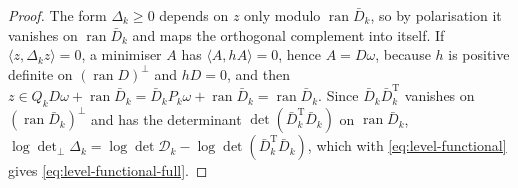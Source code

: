 \documentclass[11pt]{preprint}
\numberwithin{equation}{section}
\theoremstyle{definition}
\theoremstyle{remark}
\theoremstyle{plain}
\begin{document}
\begin{proof}
The form $\Delta_k \geq 0$ depends on $z$ only modulo $\operatorname{ran}\bar D_k$, so by polarisation it vanishes on $\operatorname{ran}\bar D_k$ and maps the orthogonal complement into itself. If $\langle z, \Delta_kz \rangle = 0$, a minimiser $A$ has $\langle A, hA \rangle = 0$, hence $A = D\omega$, because $h$ is positive definite on $(\operatorname{ran}D)^\perp$ and $hD = 0$, and then $z \in Q_kD\omega + \operatorname{ran}\bar D_k = \bar D_kP_k\omega + \operatorname{ran}\bar D_k = \operatorname{ran}\bar D_k$. Since $\bar D_k\bar D_k^{\mathrm T}$ vanishes on $(\operatorname{ran}\bar D_k)^\perp$ and has the determinant $\det(\bar D_k^{\mathrm T}\bar D_k)$ on $\operatorname{ran}\bar D_k$, $\log\det_\perp\Delta_k = \log\det\mathcal D_k - \log\det(\bar D_k^{\mathrm T}\bar D_k)$, which with \eqref{eq:level-functional} gives \eqref{eq:level-functional-full}.
\end{proof}



\end{document}
